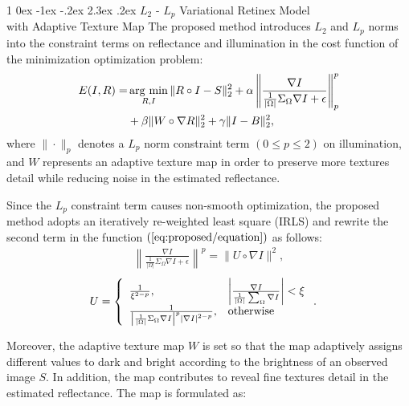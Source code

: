 \documentclass[a4paper,twocolumn,10pt]{article}
\makeatletter
\newcommand{\argmin}{\mathop{\rm arg~min}\limits}
\renewcommand{\section}{%
  \@startsection{section}%
   {1}%
   {\z@}%
   {0ex \@plus -1ex \@minus -.2ex}%
   {2.3ex \@plus.2ex}%
   {\normalfont\large\bfseries}%
}%
\makeatother
\begin{document}
\section{$L_{2}$ - $L_{p}$ Variational Retinex Model \\ with Adaptive Texture Map}
\vspace{-0.3cm}
The proposed method introduces $L_{2}$ and $L_{p}$ norms into the constraint terms on reflectance and illumination in the cost function of the minimization optimization problem:
\vspace{-0.3cm}
\begin{eqnarray}
\begin{split}
	E(I, R) = & \argmin_{R, I} \|R \circ I - S\|_{2}^{2} + \alpha \left \|\frac{\nabla{I}}{\frac{1}{|\Omega|}\Sigma_{\Omega}\nabla{I}+\epsilon}\right\|_{p}^{p} \\
	& + \beta \|W \circ \nabla{R}\|_{2}^{2} + \gamma \|I - B\|_{2}^{2}, \label{eq:proposed/equation}
\end{split}
\end{eqnarray}
where $\| \cdot \|_{p}$ denotes a $L_{p}$ norm constraint term $(0 \leq p \leq 2)$ on illumination, and $W$ represents an adaptive texture map in order to preserve more textures detail while reducing noise in the estimated reflectance.\par 
Since the $L_{p}$ constraint term causes non-smooth optimization, the proposed method adopts an iteratively re-weighted least square (IRLS) and rewrite the second term in the function $(\ref{eq:proposed/equation})$ as follows:
\vspace{-0.2cm}
\begin{eqnarray}
\left \|\frac{\nabla{I}}{\frac{1}{|\Omega|}\Sigma_{\Omega}\nabla{I}+\epsilon}\right\|^{p} = \|U \circ \nabla{I}\|^{2}, \label{eq:approximation}
\end{eqnarray}
\vspace{-0.3cm}
\begin{align}
U &= \left \{
  	\begin{array}{ll}
  	\frac{1}{\xi^{2-p}}, 
  	& \left |\frac{\nabla{I}}{\frac{1}{|\Omega|} \sum_{\Omega} \nabla{I} } \right| < \xi\\
  	\frac{1}{\left |\frac{1}{|\Omega|}\Sigma_{\Omega} \nabla{I} \right|^{p} \left |\nabla{I} \right|^{2-p}},
  	& \rm{otherwise}
  	\end{array}
\right. . \label{eq:lp_shape}
\end{align}\par
Moreover, the adaptive texture map $W$ is set so that the map adaptively assigns different values to dark and bright according to the brightness of an observed image $S$. In addition, the map contributes to reveal fine textures detail in the estimated reflectance. The map is formulated as:
\end{document}
